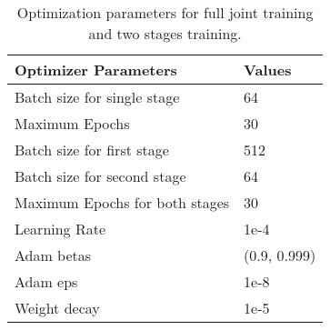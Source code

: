 \documentclass[11pt,a4paper]{article}
\begin{document}
\begin{table}[ht!]\small
    \begin{center} 
        \begin{tabular}{ll} 
            \hline  Optimizer Parameters &  Values\\  \hline
           Batch size for single stage & 64\\
 Maximum Epochs & 30 \\
           Batch size for first stage & 512\\
           Batch size for second stage & 64\\
 Maximum Epochs for both stages  & 30 \\\hline
         Learning Rate & 1e-4\\
            Adam betas & (0.9, 0.999) \\
          Adam eps & 1e-8 \\
         Weight decay  & 1e-5 \\
            \hline
        \end{tabular}
    \end{center}
	\caption{\label{table:opt} Optimization parameters for full joint training and two stages training.}
\end{table}
\end{document}
